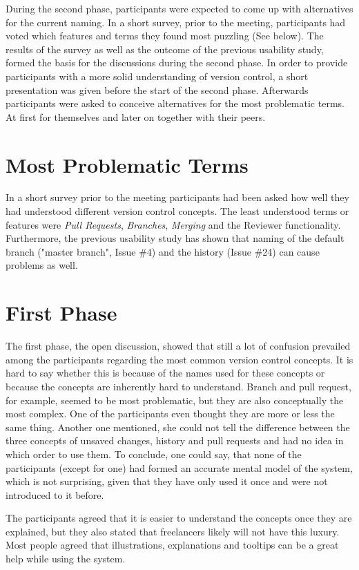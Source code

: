 During the second phase, participants were expected to come up with alternatives for the current naming. In a short survey, prior to the meeting, participants had voted which features and terms they found most puzzling (See below). The results of the survey as well as the outcome of the previous usability study, formed the basis for the discussions during the second phase. In order to provide participants with a more solid understanding of version control, a short presentation was given before the start of the second phase. Afterwards participants were asked to conceive alternatives for the most problematic terms. At first for themselves and later on together with their peers.

\section{Most Problematic Terms}
In a short survey prior to the meeting participants had been asked how well they had understood different version control concepts. The least understood terms or features were \emph{Pull Requests}, \emph{Branches}, \emph{Merging} and the Reviewer functionality. Furthermore, the previous usability study has shown that naming of the default branch ("master branch", Issue \#4) and the history (Issue \#24) can cause problems as well.

\section{First Phase}
The first phase, the open discussion, showed that still a lot of confusion prevailed among the participants regarding the most common version control concepts. It is hard to say whether this is because of the names used for these concepts or because the concepts are inherently hard to understand. Branch and pull request, for example, seemed to be most problematic, but they are also conceptually the most complex. One of the participants even thought they are more or less the same thing. Another one mentioned, she could not tell the difference between the three concepts of unsaved changes, history and pull requests and had no idea in which order to use them. To conclude, one could say, that none of the participants (except for one) had formed an accurate mental model of the system, which is not surprising, given that they have only used it once and were not introduced to it before.

The participants agreed that it is easier to understand the concepts once they are explained, but they also stated that freelancers likely will not have this luxury. Most people agreed that illustrations, explanations and tooltips can be a great help while using the system.

